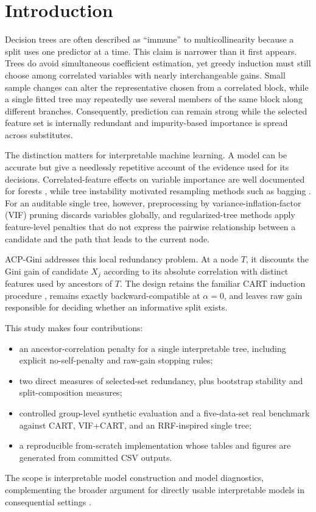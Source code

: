 \documentclass[runningheads]{llncs}
\begin{document}
\section{Introduction}
Decision trees are often described as ``immune'' to multicollinearity because a split uses one predictor at a time. This claim is narrower than it first appears. Trees do avoid simultaneous coefficient estimation, yet greedy induction must still choose among correlated variables with nearly interchangeable gains. Small sample changes can alter the representative chosen from a correlated block, while a single fitted tree may repeatedly use several members of the same block along different branches. Consequently, prediction can remain strong while the selected feature set is internally redundant and impurity-based importance is spread across substitutes.

The distinction matters for interpretable machine learning. A model can be accurate but give a needlessly repetitive account of the evidence used for its decisions. Correlated-feature effects on variable importance are well documented for forests \cite{strobl2008conditional,nicodemus2010correlation,louppe2013importance}, while tree instability motivated resampling methods such as bagging \cite{breiman1996bagging}. For an auditable single tree, however, preprocessing by variance-inflation-factor (VIF) pruning discards variables globally, and regularized-tree methods apply feature-level penalties that do not express the pairwise relationship between a candidate and the path that leads to the current node.

ACP-Gini addresses this local redundancy problem. At a node $T$, it discounts the Gini gain of candidate $X_j$ according to its absolute correlation with distinct features used by ancestors of $T$. The design retains the familiar CART induction procedure \cite{breiman1984cart,hastie2009esl}, remains exactly backward-compatible at $\alpha=0$, and leaves raw gain responsible for deciding whether an informative split exists.

This study makes four contributions:
\begin{itemize}
\item an ancestor-correlation penalty for a single interpretable tree, including explicit no-self-penalty and raw-gain stopping rules;
\item two direct measures of selected-set redundancy, plus bootstrap stability and split-composition measures;
\item controlled group-level synthetic evaluation and a five-data-set real benchmark against CART, VIF+CART, and an RRF-inspired single tree;
\item a reproducible from-scratch implementation whose tables and figures are generated from committed CSV outputs.
\end{itemize}
The scope is interpretable model construction and model diagnostics, complementing the broader argument for directly usable interpretable models in consequential settings \cite{rudin2019stop}.
\end{document}
